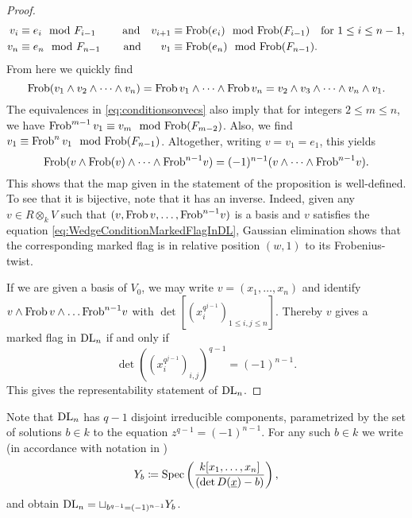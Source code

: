 \documentclass[../main.tex]{subfiles}
\begin{document}
\begin{prop}
\begin{proof}
  \begin{equation}\label{eq:conditionsonvecs}
    \begin{aligned}
      v_i &\equiv e_i \mod F_{i-1} \quad &\text{and} \quad v_{i+1} &\equiv
      \mathrm{Frob}(e_i) \mod {\mathrm{Frob}}(F_{i-1}) \quad \text{for } 1 \leq i \leq n-1,\\ 
      v_n &\equiv e_n \mod F_{n-1} \quad &\text{and}\hspace{0.8em}\quad  v_1 &\equiv
    \mathrm{Frob}(e_n) \mod {\mathrm{Frob}}(F_{n-1}).
  \end{aligned}
\end{equation}
  From here we quickly find
  \begin{equation*}
    \mathrm{Frob}(v_1 \wedge v_2 \wedge \dots \wedge v_n) = 
    \mathrm{Frob}\, v_1 \wedge \dots \wedge \mathrm{Frob}\, v_n = v_2 \wedge v_3
    \wedge \dots \wedge v_{n} \wedge v_1.
  \end{equation*}
  The equivalences in \eqref{eq:conditionsonvecs} also imply that for integers
  $2 \leq m \leq n$, we have $\mathrm{Frob}^{m-1} \, v_1
  \equiv v_m \mod {\mathrm{Frob}}(F_{m-2})$. Also, we find $v_1 \equiv \mathrm{Frob}^n \, v_1 \mod {\mathrm{Frob}}
  (F_{n-1})$. Altogether, writing $v = v_1 = e_1$, this yields 
  \begin{equation}\label{eq:WedgeConditionMarkedFlagInDL}
    \mathrm{Frob} (v \wedge \mathrm{Frob}(v) \wedge \dots \wedge \mathrm{Frob}^{n-1} v) = 
    (-1)^{n-1} (v \wedge \dots \wedge \mathrm{Frob}^{n-1}v).
  \end{equation}
  This shows that the map given in the statement of the proposition is
  well-defined. To see that it is bijective, note that it has an inverse. Indeed,
  given any $v \in R \otimes_k V$ such that $(v, \mathrm{Frob}\, v, \dots, \mathrm{Frob}^{n-1} v)$
  is a basis and $v$ satisfies the equation \eqref{eq:WedgeConditionMarkedFlagInDL},
  Gaussian elimination shows that the corresponding marked flag is in relative
  position $(w,1)$ to its Frobenius-twist.

  If we are given a basis of $V_0$, we may write $v = (x_1, \dots, x_n)$
  and identify $v \wedge \mathrm{Frob}\, v \wedge \dots \mathrm{Frob}^{n-1} v$ with
  $\det\left[ (x_i^{q^{j-1}})_{1 \leq i,j \leq n} \right]$.
  Thereby $v$ gives a marked flag in $\mathrm{DL}_n$ if and only if
  \begin{equation*}
    \det((x_i^{q^{j-1}})_{i,j})^{q-1} = (-1)^{n-1}.
  \end{equation*}
  This gives the representability statement of $\mathrm{DL}_n$.
\end{proof}
\end{prop}

Note that $\mathrm{DL}_n$ has $q-1$ disjoint irreducible components, parametrized by the set
of solutions $b \in k$ to the equation $z^{q-1}=(-1)^{n-1}$. For any such $b
\in k$ we write (in accordance with notation in \cite{mieda2016geometric})
\begin{equation}\label{eq:DefYb}
  Y_b \coloneqq \operatorname{Spec} \left(\frac{k[x_1, \dots, x_n]}{(\det D(\underline x) - b)}\right),
\end{equation}
and obtain $\mathrm{DL}_n = \sqcup_{b^{q-1} = (-1)^{n-1}} Y_b$.
\end{document}
